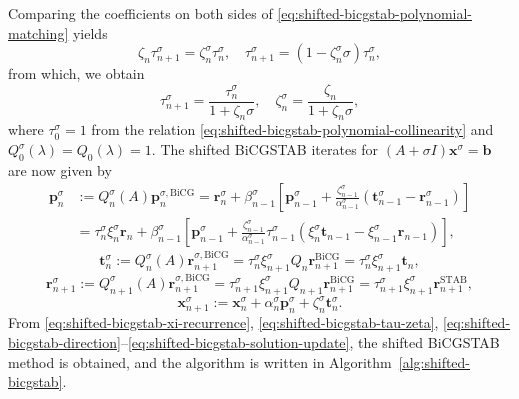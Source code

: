 {Comparing the coefficients on both sides of \eqref{eq:shifted-bicgstab-polynomial-matching} yields}
\[\zeta_n\tau_{n+1}^{\sigma}=\zeta_n^{\sigma}\tau_n^{\sigma},\quad\tau_{n+1}^{\sigma}=(1-\zeta_n^{\sigma}\sigma)\tau_n^{\sigma},\]
{from which, we obtain}
\begin{equation}\label{eq:shifted-bicgstab-tau-zeta}\tau_{n+1}^{\sigma}=\frac{\tau_n^{\sigma}}{1+\zeta_n\sigma},\quad\zeta_n^{\sigma}=\frac{\zeta_n}{1+\zeta_n\sigma},\end{equation}
{where $\tau_0^{\sigma}=1$ from the relation \eqref{eq:shifted-bicgstab-polynomial-collinearity} and $Q_0^{\sigma}(\lambda)=Q_0(\lambda)=1$. The shifted BiCGSTAB iterates for $(A+\sigma I)\bm x^{\sigma}=\bm b$ are now given by}
\begin{equation}\label{eq:shifted-bicgstab-direction}\begin{aligned}\bm p_n^{\sigma}&:=Q_n^{\sigma}(A)\bm p_n^{\sigma,\mathrm{BiCG}}=\bm r_n^{\sigma}+\beta_{n-1}^{\sigma}\left[\bm p_{n-1}^{\sigma}+\frac{\zeta_{n-1}^{\sigma}}{\alpha_{n-1}^{\sigma}}(\bm t_{n-1}^{\sigma}-\bm r_{n-1}^{\sigma})\right]\\&=\tau_n^{\sigma}\xi_n^{\sigma}\bm r_n+\beta_{n-1}^{\sigma}\left[\bm p_{n-1}^{\sigma}+\frac{\zeta_{n-1}^{\sigma}}{\alpha_{n-1}^{\sigma}}\tau_{n-1}^{\sigma}(\xi_n^{\sigma}\bm t_{n-1}-\xi_{n-1}^{\sigma}\bm r_{n-1})\right],\end{aligned}\end{equation}
\begin{equation}\label{eq:shifted-bicgstab-intermediate}\bm t_n^{\sigma}:=Q_n^{\sigma}(A)\bm r_{n+1}^{\sigma,\mathrm{BiCG}}=\tau_n^{\sigma}\xi_{n+1}^{\sigma}Q_n\bm r_{n+1}^{\mathrm{BiCG}}=\tau_n^{\sigma}\xi_{n+1}^{\sigma}\bm t_n,\end{equation}
\begin{equation}\label{eq:shifted-bicgstab-residual-update}\bm r_{n+1}^{\sigma}:=Q_{n+1}^{\sigma}(A)\bm r_{n+1}^{\sigma,\mathrm{BiCG}}=\tau_{n+1}^{\sigma}\xi_{n+1}^{\sigma}Q_{n+1}\bm r_{n+1}^{\mathrm{BiCG}}=\tau_{n+1}^{\sigma}\xi_{n+1}^{\sigma}\bm r_{n+1}^{\mathrm{STAB}},\end{equation}
\begin{equation}\label{eq:shifted-bicgstab-solution-update}\bm x_{n+1}^{\sigma}:=\bm x_n^{\sigma}+\alpha_n^{\sigma}\bm p_n^{\sigma}+\zeta_n^{\sigma}\bm t_n^{\sigma}.\end{equation}
{From \eqref{eq:shifted-bicgstab-xi-recurrence}, \eqref{eq:shifted-bicgstab-tau-zeta}, \eqref{eq:shifted-bicgstab-direction}--\eqref{eq:shifted-bicgstab-solution-update}, the shifted BiCGSTAB method is obtained, and the algorithm is written in Algorithm\ \ref{alg:shifted-bicgstab}.}
